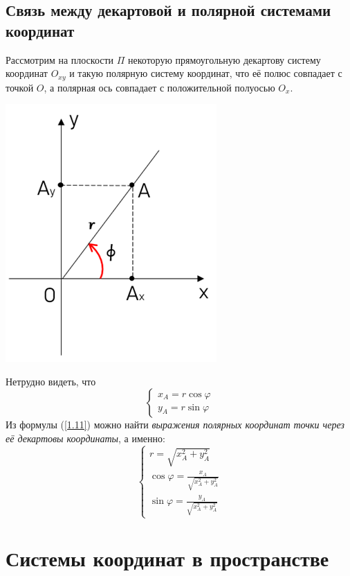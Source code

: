 \documentclass[a4paper, 12pt]{report}
\begin{document}
	\subsection{Связь между декартовой и полярной системами координат}
	\quad{} Рассмотрим на плоскости $\Pi$ некоторую прямоугольную декартову систему координат $O_{xy}$ и такую полярную систему координат, что её полюс совпадает с точкой $O$, а полярная ось совпадает с положительной полуосью $O_x$.
	\begin{center}
		\includegraphics{img/1.2.3 dpsk with polar.png}
	\end{center}
	Нетрудно видеть, что
	\begin{equation}\label{1.11}
		\left\{
		\begin{split}
			x_A = r\cos \varphi \\
			y_A = r\sin \varphi
		\end{split}
		\right. \tag{11}
	\end{equation}
	Из формулы (\ref{1.11}) можно найти \textit{выражения полярных координат точки через её декартовы координаты}, а именно:
	\begin{equation}\label{1.12}
		\boxed{\left\{
		\begin{split}
			r = \sqrt{x_A^2 + y_A^2} \\
			\cos \varphi = \frac{x_A}{\sqrt{x_A^2+y_A^2}} \\
			\sin \varphi = \frac{y_A}{\sqrt{x_A^2+y_A^2}}
		\end{split}
		\right.} \tag{12}
	\end{equation}
	
	\section{Системы координат в пространстве}
\end{document}
